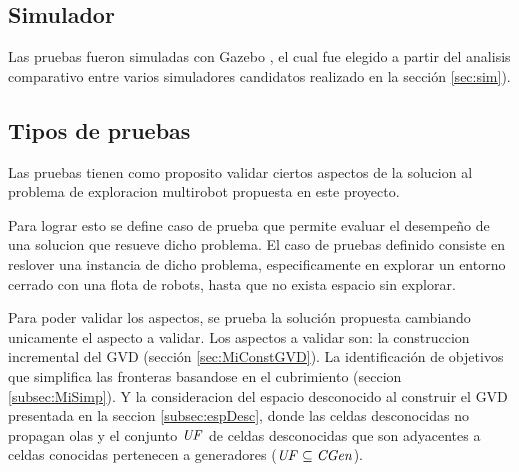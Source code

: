 
\subsection{Simulador}
Las pruebas fueron simuladas con Gazebo \cite{gazebo}, el cual fue elegido a
partir del analisis comparativo entre varios simuladores candidatos realizado
en la sección \ref{sec:sim}). 

\subsection{Tipos de pruebas}
Las pruebas tienen como proposito validar ciertos aspectos de la
solucion al problema de exploracion multirobot propuesta en este proyecto.
 
Para lograr esto se define caso de prueba que permite evaluar el desempeño de
una solucion que resueve dicho problema. El caso de pruebas definido consiste
en reslover una instancia de dicho problema, especificamente en explorar un
entorno cerrado con una flota de robots, hasta que no exista espacio sin
explorar.

Para poder validar los aspectos, se prueba la solución propuesta cambiando
unicamente el aspecto a validar. Los aspectos a validar son: la construccion
incremental del GVD (sección \ref{sec:MiConstGVD}). La identificación de
objetivos que simplifica las fronteras basandose en el cubrimiento (seccion
\ref{subsec:MiSimp}). Y la consideracion del espacio desconocido al construir
el GVD presentada en la seccion \ref{subsec:espDesc}, donde las celdas
desconocidas no propagan olas y el conjunto $\mathit{UF}$ de celdas desconocidas
que son adyacentes a celdas conocidas pertenecen a generadores ($\mathit{UF}
\subseteq \mathit{CGen}$).

